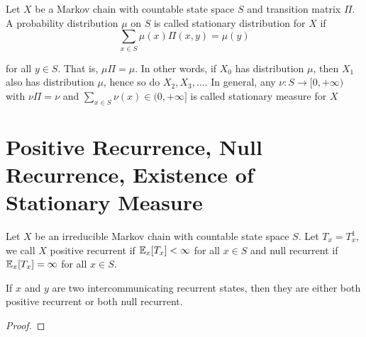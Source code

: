 \documentclass{report}
\begin{document}
\begin{definition}
    Let $X$ be a Markov chain with countable state space $S$ and transition matrix $\Pi$. A probability distribution $\mu$ on $S$ is called stationary distribution for $X$ if
    $$
        \sum_{x \in S} \mu(x) \Pi(x, y) = \mu(y)
    $$

    for all $y \in S$. That is, $\mu \Pi = \mu$. In other words, if $X_0$ has distribution $\mu$, then $X_1$ also has distribution $\mu$, hence so do $X_2, X_3, ...$. In general, any $\nu: S \to [0, +\infty)$ with $\nu \Pi = \nu$ and $\sum_{x \in S} \nu(x) \in (0, +\infty]$ is called stationary measure for $X$
\end{definition}

\section{Positive Recurrence, Null Recurrence, Existence of Stationary Measure}

\begin{definition}
    Let $X$ be an irreducible Markov chain with countable state space $S$. Let $T_x = T_x^1$,  we call $X$ positive recurrent if $\mathbb{E}_x[T_x] < \infty$ for all $x \in S$ and null recurrent if $\mathbb{E}_x[T_x] = \infty$ for all $x \in S$.
\end{definition}

\begin{proposition}
    If $x$ and $y$ are two intercommunicating recurrent states, then they are either both positive recurrent or both null recurrent.
\begin{proof}
\end{proof}
\end{proposition}
\end{document}
